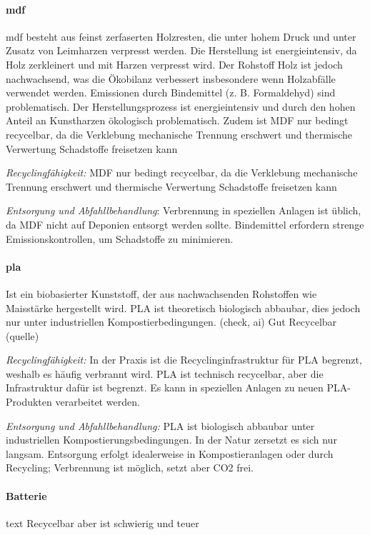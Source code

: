 \paragraph{\acrlong{mdf}}
\acrshort{mdf} besteht aus feinst zerfaserten Holzresten, die unter hohem Druck und unter Zusatz von Leimharzen verpresst werden. Die Herstellung ist energieintensiv, da Holz zerkleinert und mit Harzen verpresst wird. Der Rohstoff Holz ist jedoch nachwachsend, was die Ökobilanz verbessert insbesondere wenn Holzabfälle verwendet werden. Emissionen durch Bindemittel (z. B. Formaldehyd) sind problematisch.\cite{support-2024}
Der Herstellungsprozess ist energieintensiv und durch den hohen Anteil an Kunstharzen ökologisch problematisch. Zudem ist MDF nur bedingt recycelbar, da die Verklebung mechanische Trennung erschwert und thermische Verwertung Schadstoffe freisetzen kann\cite{support-2024}

\textit{Recyclingfähigkeit:} MDF nur bedingt recycelbar, da die Verklebung mechanische Trennung erschwert und thermische Verwertung Schadstoffe freisetzen kann

\textit{Entsorgung und Abfahllbehandlung}: Verbrennung in speziellen Anlagen ist üblich, da MDF
nicht auf Deponien entsorgt werden sollte. Bindemittel erfordern strenge Emissionskontrollen, um Schadstoffe zu minimieren.\cite{mdf-entsorgung}


\paragraph{\acrlong{pla}}

Ist ein biobasierter Kunststoff, der aus nachwachsenden Rohstoffen wie Maisstärke hergestellt wird. PLA ist theoretisch biologisch abbaubar, dies jedoch nur unter industriellen Kompostierbedingungen.  (check, ai)
Gut Recycelbar
(quelle)

\textit{Recyclingfähigkeit:} In der Praxis ist die Recyclinginfrastruktur für PLA begrenzt, weshalb es häufig verbrannt wird. PLA ist technisch recycelbar, aber die Infrastruktur dafür ist begrenzt.
Es kann in speziellen Anlagen zu neuen PLA-Produkten verarbeitet werden. \cite{pla-recycling}

\textit{Entsorgung und Abfahllbehandlung:} PLA ist biologisch abbaubar unter industriellen Kompostierungsbedingungen. In der Natur zersetzt es sich nur langsam. Entsorgung erfolgt
idealerweise in Kompostieranlagen oder durch Recycling; Verbrennung ist möglich, setzt
aber CO2 frei.\cite{pla-details}


\paragraph{Batterie}
text
Recycelbar aber ist schwierig und teuer\cite{regan-2023}




